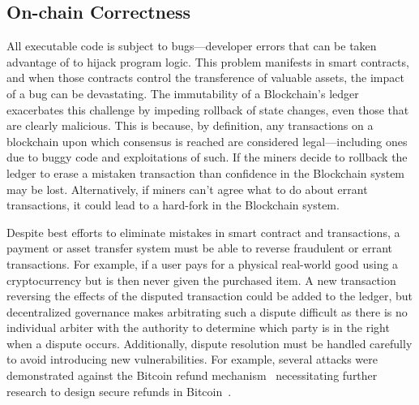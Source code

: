 
\subsection{On-chain Correctness}
All executable code is subject to bugs---developer errors that can be taken advantage of to hijack program logic. This problem manifests in smart contracts, and when those contracts control the transference of valuable assets, the impact of a bug can be devastating. The immutability of a Blockchain's ledger exacerbates this challenge by impeding rollback of state changes, even those that are clearly malicious. This is because, by definition, any transactions on a blockchain upon which consensus is reached are considered legal---including ones due to buggy code and exploitations of such. If the miners decide to rollback the ledger to erase a mistaken transaction than confidence in the Blockchain system may be lost. Alternatively, if miners can't agree what to do about errant transactions, it could lead to a hard-fork in the Blockchain system.

Despite best efforts to eliminate mistakes in smart contract and transactions, a payment or asset transfer system must be able to reverse fraudulent or errant transactions. For example, if a user pays for a physical real-world good using a cryptocurrency but is then never given the purchased item. A new transaction reversing the effects of the disputed transaction could be added to the ledger, but decentralized governance makes arbitrating such a dispute difficult as there is no individual arbiter with the authority to determine which party is in the right when a dispute occurs.  Additionally, dispute resolution must be handled carefully to avoid introducing new vulnerabilities.  For example, several attacks were demonstrated against the Bitcoin refund mechanism~\cite{FC:MccShaHao16} necessitating further research to design secure refunds in Bitcoin~\cite{arxiv:AviSafSha18}.

